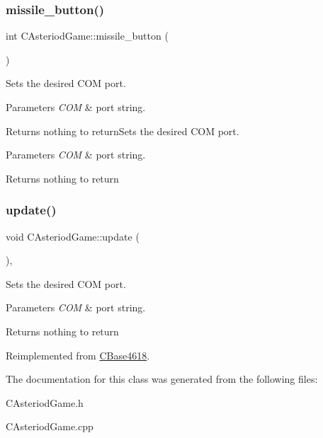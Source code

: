 \hypertarget{class_c_asteriod_game_ae0c06cee7387733f0ac1ec829a85b9a2}{}\label{class_c_asteriod_game_ae0c06cee7387733f0ac1ec829a85b9a2} 
\subsubsection{\texorpdfstring{missile\+\_\+button()}{missile\_button()}}
{\footnotesize\ttfamily int C\+Asteriod\+Game\+::missile\+\_\+button (\begin{DoxyParamCaption}{ }\end{DoxyParamCaption})}



Sets the desired C\+OM port. 


\begin{DoxyParams}{Parameters}
{\em C\+OM} & port string. \\
\hline
\end{DoxyParams}
\begin{DoxyReturn}{Returns}
nothing to return\+Sets the desired C\+OM port.
\end{DoxyReturn}

\begin{DoxyParams}{Parameters}
{\em C\+OM} & port string. \\
\hline
\end{DoxyParams}
\begin{DoxyReturn}{Returns}
nothing to return 
\end{DoxyReturn}
\hypertarget{class_c_asteriod_game_abe38958a37bed1b2ed5f9b08bc0332bb}{}\label{class_c_asteriod_game_abe38958a37bed1b2ed5f9b08bc0332bb} 
\subsubsection{\texorpdfstring{update()}{update()}}
{\footnotesize\ttfamily void C\+Asteriod\+Game\+::update (\begin{DoxyParamCaption}{ }\end{DoxyParamCaption})\hspace{0.3cm}{\ttfamily [override]}, {\ttfamily [virtual]}}



Sets the desired C\+OM port. 


\begin{DoxyParams}{Parameters}
{\em C\+OM} & port string. \\
\hline
\end{DoxyParams}
\begin{DoxyReturn}{Returns}
nothing to return 
\end{DoxyReturn}


Reimplemented from \hyperlink{class_c_base4618_ae1ac81eaa56ded6600262c361f723cb8}{C\+Base4618}.



The documentation for this class was generated from the following files\+:\begin{DoxyCompactItemize}
\item 
C\+Asteriod\+Game.\+h\item 
C\+Asteriod\+Game.\+cpp\end{DoxyCompactItemize}
